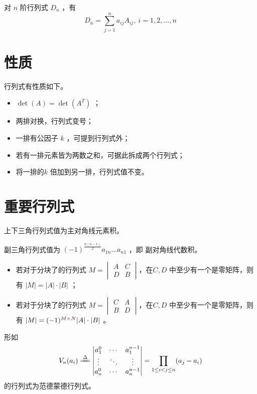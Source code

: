 \begin{Def}[展开定义]

    对 $ n $ 阶行列式 $ D_n $ ，有$$
        D_n = \sum_{j=1}^n a_{ij}A_{ij},\ i=1,2,\dots,n
    $$ 
\end{Def}

\section{性质}

行列式有性质如下。
\begin{itemize}
    \item $ \det(A) = \det(A^T) $ ；
    \item 两排对换，行列式变号；
    \item 一排有公因子 $ k $ ，可提到行列式外；
    \item 若有一排元素皆为两数之和，可据此拆成两个行列式；
    \item 将一排的$ k $ 倍加到另一排，行列式值不变。
\end{itemize}

\section{重要行列式}


上下三角行列式值为主对角线元素积。


副三角行列式值为 $ (-1)^{\frac{n(n-1)}{2}}a_{1n}\dots a_{n1} $ ，即
副对角线代数积。

\begin{itemize}
    \item 若对于分块了的行列式 $ M = \begin{vmatrix}A&C\\D&B\end{vmatrix} $，\nextline 在$ C,D $ 中至少有一个是零矩阵，则有
    $ |M| = |A|\cdot|B| $ ；
    \item 若对于分块了的行列式 $ M = \begin{vmatrix}C&A\\B&D\end{vmatrix} $，\nextline 在$ C,D $ 中至少有一个是零矩阵，则有
    $ |M| = (-1)^{M\textcolor{red}{\bf{\times}}N}|A|\cdot|B| $ 。
\end{itemize}


形如
$$
    V_n(a_i)\xlongequal{\Delta}\begin{vmatrix}
        a_1^0& \cdots& a_1^{n-1}\\ 
        \vdots&\ddots&\vdots\\
        a_n^0& \cdots& a_n^{n-1}\\
    \end{vmatrix} = \prod_{1\leq i < j \leq n}(a_j-a_i)
$$ 
的行列式为范德蒙德行列式。

